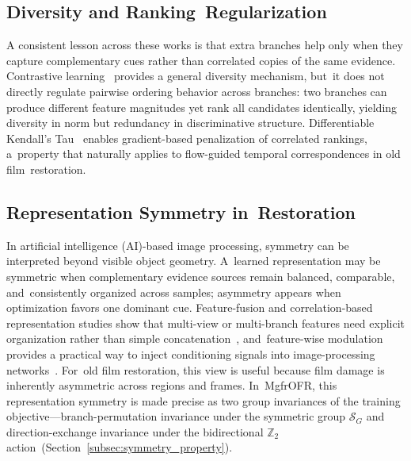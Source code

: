 \documentclass[symmetry,article,accept,pdftex,moreauthors]{Definitions/mdpi}
\begin{document}
\subsection{Diversity and Ranking~Regularization}
\label{subsec:diversity_ranking}

A consistent lesson across these works is that extra branches help only when they capture complementary cues rather than correlated copies of the same evidence. Contrastive learning~\cite{chen2020mocov2} provides a general diversity mechanism, but~it does not directly regulate pairwise ordering behavior across branches: two branches can produce different feature magnitudes yet rank all candidates identically, yielding diversity in norm but redundancy in discriminative structure. Differentiable Kendall's Tau~\cite{zheng2023diffkendall} enables gradient-based penalization of correlated rankings, a~property that naturally applies to flow-guided temporal correspondences in old film~restoration.

\subsection{Representation Symmetry in~Restoration}
\label{subsec:symmetry_ai}

In artificial intelligence (AI)-based image processing, symmetry can be interpreted beyond visible object geometry. A~learned representation may be symmetric when complementary evidence sources remain balanced, comparable, and~consistently organized across samples; asymmetry appears when optimization favors one dominant cue. Feature-fusion and correlation-based representation studies show that multi-view or multi-branch features need explicit organization rather than simple concatenation~\cite{yu2021multiview_tensor_fusion,qian2020multiview_matrix_correlation}, and~feature-wise modulation provides a practical way to inject conditioning signals into image-processing networks~\cite{perez2018film}. For~old film restoration, this view is useful because film damage is inherently asymmetric across regions and frames. In~MgfrOFR, this representation symmetry is made precise as two group invariances of the training objective---branch-permutation invariance under the symmetric group $\mathcal{S}_G$ and direction-exchange invariance under the bidirectional $\mathbb{Z}_2$ action~(Section~\ref{subsec:symmetry_property}).
\end{document}
